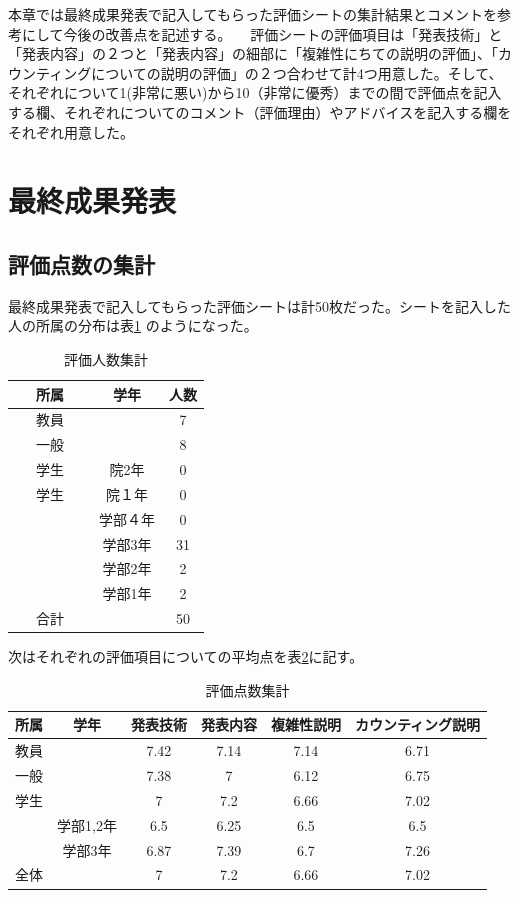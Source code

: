  本章では最終成果発表で記入してもらった評価シートの集計結果とコメントを参考にして今後の改善点を記述する。
　評価シートの評価項目は「発表技術」と「発表内容」の２つと「発表内容」の細部に「複雑性にちての説明の評価」、「カウンティングについての説明の評価」の２つ合わせて計4つ用意した。そして、それぞれについて1(非常に悪い)から10（非常に優秀）までの間で評価点を記入する欄、それぞれについてのコメント（評価理由）やアドバイスを記入する欄をそれぞれ用意した。
\section{最終成果発表}
\subsection{評価点数の集計}
最終成果発表で記入してもらった評価シートは計50枚だった。シートを記入した人の所属の分布は表\ref{tab:dist2} のようになった。

\begin{table}[htb]
  \begin{center}
    \caption{評価人数集計}
    \begin{tabular}{|c|c|c|} \hline 
      所属 & 学年 & 人数  \\ \hline \hline
      教員 &  & 7  \\
      一般 &  & 8 \\
      学生 & 院2年 & 0 \\
     学生 & 院１年 & 0 \\
             & 学部４年 & 0 \\
 　　　　　 & 学部3年 & 31 \\
             & 学部2年 & 2 \\
             & 学部1年 & 2 \\ \hline \hline
      合計 &  & 50 \\ \hline
    \end{tabular}
    \label{tab:dist2}
  \end{center}
\end{table}
次はそれぞれの評価項目についての平均点を表\ref{tab:point2}に記す。
\begin{table}[H]
\begin{center}
\caption{評価点数集計}
\begin{tabular}{|c|c|c|c|c|c|} \hline
  所属 & 学年 & 発表技術 & 発表内容 & 複雑性説明 & カウンティング説明  \\ \hline \hline
  教員 &        & 7.42 & 7.14 & 7.14 & 6.71 \\ 
  一般 &        & 7.38 & 7 & 6.12 & 6.75 \\
  学生 &        & 7 & 7.2 & 6.66 & 7.02 \\
         & 学部1,2年 & 6.5 & 6.25 & 6.5 & 6.5 \\
         & 学部3年 & 6.87 & 7.39 & 6.7 & 7.26 \\ \hline \hline
  全体 &        & 7 & 7.2 & 6.66 & 7.02 \\ \hline
\end{tabular}
\label{tab:point2}
\end{center}
\end{table}

